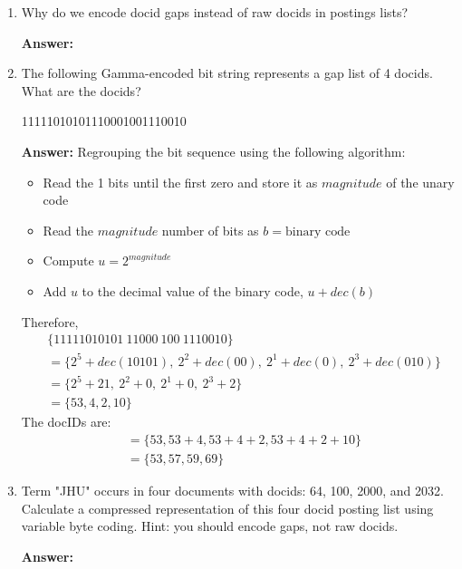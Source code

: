 \documentclass[11pt]{article}
\begin{document}
\begin{enumerate}
\begin{enumerate}
          \item Why do we encode docid gaps instead of raw docids in postings lists?

                \textbf{Answer:}

          \item The following Gamma-encoded bit string represents a gap list of 4 docids. What are the docids?

                11111010101110001001110010

                \textbf{Answer:} Regrouping the bit sequence using the following algorithm:
                \begin{itemize}
                  \item Read the 1 bits until the first zero and store it as $magnitude$ of the unary code
                  \item Read the $magnitude$ number of bits as $b=\text{binary code}$
                  \item Compute $u=2^{magnitude}$
                  \item Add $u$ to the decimal value of the binary code, $u + dec(b)$
                \end{itemize}
                Therefore,
                \begin{align*}
                   & \{111110 10101 \ 110 00 \ 10 0 \ 1110 010 \}                               \\
                   & = \{2^5 + dec(10101), \ 2^2 +  dec(00), \ 2^1 + dec(0), \ 2^3 + dec(010)\} \\
                   & = \{2^5 + 21, \ 2^2 +  0, \ 2^1 + 0, \ 2^3 + 2\}                           \\
                   & = \{53, 4, 2, 10\}
                \end{align*}
                The docIDs are:
                \begin{align*}
                   & = \{53, 53+4, 53+4+2, 53+4+2+10\} \\
                   & = \{53, 57, 59, 69\}
                \end{align*}

          \item Term "JHU" occurs in four documents with docids: 64, 100, 2000, and 2032. Calculate a compressed representation of this four docid posting list using variable byte coding. Hint: you should encode gaps, not raw docids.

                \textbf{Answer:}


\end{enumerate}
\end{enumerate}
\end{document}
